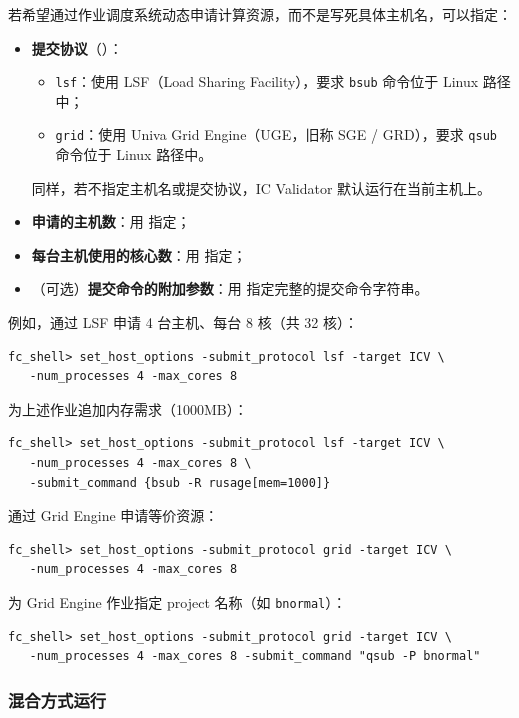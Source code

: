 若希望通过作业调度系统动态申请计算资源，而不是写死具体主机名，可以指定：
\begin{itemize}
  \item \textbf{提交协议}（）：
        \begin{itemize}
          \item \texttt{lsf}：使用 LSF（Load Sharing Facility），要求 \texttt{bsub} 命令位于 Linux 路径中；
          \item \texttt{grid}：使用 Univa Grid Engine（UGE，旧称 SGE / GRD），要求 \texttt{qsub} 命令位于 Linux 路径中。
        \end{itemize}
        同样，若不指定主机名或提交协议，IC Validator 默认运行在当前主机上。
  \item \textbf{申请的主机数}：用  指定；
  \item \textbf{每台主机使用的核心数}：用  指定；
  \item （可选）\textbf{提交命令的附加参数}：用  指定完整的提交命令字符串。
\end{itemize}

例如，通过 LSF 申请 4 台主机、每台 8 核（共 32 核）：
\begin{lstlisting}
fc_shell> set_host_options -submit_protocol lsf -target ICV \
   -num_processes 4 -max_cores 8
\end{lstlisting}

为上述作业追加内存需求（1000MB）：
\begin{lstlisting}
fc_shell> set_host_options -submit_protocol lsf -target ICV \
   -num_processes 4 -max_cores 8 \
   -submit_command {bsub -R rusage[mem=1000]}
\end{lstlisting}

通过 Grid Engine 申请等价资源：
\begin{lstlisting}
fc_shell> set_host_options -submit_protocol grid -target ICV \
   -num_processes 4 -max_cores 8
\end{lstlisting}

为 Grid Engine 作业指定 project 名称（如 \texttt{bnormal}）：
\begin{lstlisting}
fc_shell> set_host_options -submit_protocol grid -target ICV \
   -num_processes 4 -max_cores 8 -submit_command "qsub -P bnormal"
\end{lstlisting}

\subsubsection{混合方式运行}
